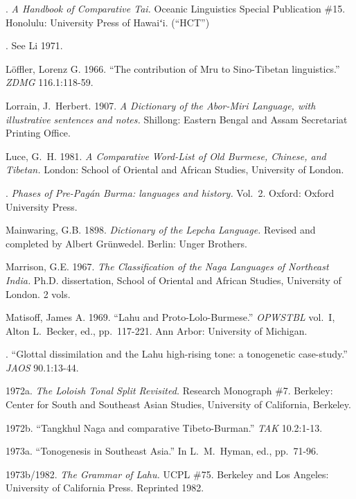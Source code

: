 .
\textit{A Handbook of Comparative Tai.}
Oceanic Linguistics Special Publication \#15. Honolulu: University Press of Hawaiʻi. (“HCT”)

.
See Li 1971.

Löffler, Lorenz G.
1966.
“The contribution of Mru to Sino-Tibetan linguistics.”
\textit{ZDMG} 116.1:118-59.

Lorrain, J.~Herbert.
1907.
\textit{A Dictionary of the Abor-Miri Language, with illustrative sentences and notes.}
Shillong: Eastern Bengal and Assam Secretariat Printing Office.

Luce, G.~H.
1981.
\textit{A Comparative Word-List of Old Burmese, Chinese, and Tibetan.}
London: School of Oriental and African Studies, University of London.

.
\textit{Phases of Pre-Pagán Burma: languages and history.}
Vol.~2. Oxford: Oxford University Press.

Mainwaring, G.B.
1898.
\textit{Dictionary of the Lepcha Language.}
Revised and completed by Albert Grünwedel. Berlin: Unger Brothers.

Marrison, G.E.
1967.
\textit{The Classification of the Naga Languages of Northeast India.}
Ph.D. dissertation, School of Oriental and African Studies, University of London.  2 vols.

Matisoff, James A.
1969.
“Lahu and Proto-Lolo-Burmese.”
\textit{OPWSTBL} vol.\ I, Alton L.\ Becker, ed., pp.\ 117-221.  Ann Arbor: University of Michigan.

.
“Glottal dissimilation and the Lahu high-rising tone: a tonogenetic case-study.”
\textit{JAOS} 90.1:13-44.

\rrefline %
1972a.
\textit{The Loloish Tonal Split Revisited.}
Research Monograph \#7.  Berkeley: Center for South and Southeast Asian Studies, University of California, Berkeley.

\rrefline %
1972b.
“Tangkhul Naga and comparative Tibeto-Burman.”
\textit{TAK} 10.2:1-13.

\rrefline %
1973a.
“Tonogenesis in Southeast Asia.”
In L.~M.~Hyman, ed., pp.\ 71-96.

\rrefline %
1973b/1982.
\textit{The Grammar of Lahu.}
UCPL \#75. Berkeley and Los Angeles: University of California Press. Reprinted 1982.


